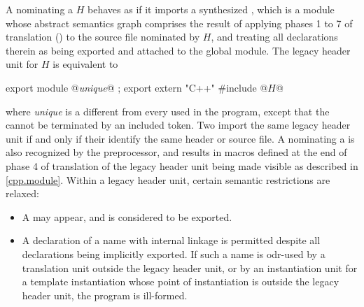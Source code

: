 \begin{std.txt}
\begin{after}
  \color{addclr}
  \alinea
  A  nominating
  a  $H$ behaves as if it imports
  a synthesized ,
  which is a module whose abstract semantics graph
  comprises the result of applying
  phases 1 to 7 of translation ()
  to the source file nominated by $H$, and
  treating all declarations therein as being
  exported and attached to the global module.
  \enternote
  The legacy header unit for $H$ is equivalent to
  \begin{codeblock}\color{addclr}
  export module @\textit{unique}@ ;
  export extern "C++" {
  #include @$H$@
  }\end{codeblock}
  where \textit{unique} is a 
  different from every 
  used in the program,
  except that the  cannot be
  terminated by an included \tcode{\}} token.
  \exitnote
  Two
  import the same legacy header unit if and only if
  their  identify the same
  header or source file.
  \enternote
  A  nominating
  a  is also recognized by the
  preprocessor, and results in macros defined at the
  end of phase 4 of translation of the legacy header unit
  being made visible as described in \ref{cpp.module}.
  \exitnote
  Within a legacy header unit, certain semantic restrictions
  are relaxed:
  \begin{itemize}
  \item A  may appear,
  and is considered to be exported.
  \item A declaration of a name with internal linkage is
  permitted despite all declarations being implicitly exported.
  If such a name is
  odr-used by a translation unit outside the legacy
  header unit, or by an instantiation unit for a template
  instantiation whose point of instantiation is outside
  the legacy header unit, the program is ill-formed.
  \end{itemize}
  \end{after}


\end{std.txt}
